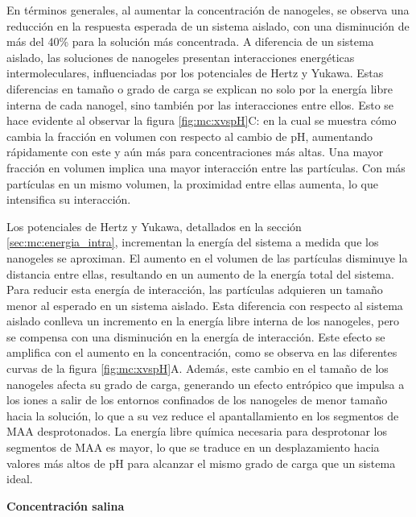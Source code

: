	En t\'erminos generales, al aumentar la concentraci\'on de nanogeles, se observa una reducci\'on en la respuesta esperada de un sistema aislado, con una disminuci\'on de m\'as del 40\% para la soluci\'on m\'as concentrada. A diferencia de un sistema aislado, las soluciones de nanogeles presentan interacciones energ\'eticas intermoleculares, influenciadas por los potenciales de Hertz y Yukawa. Estas diferencias en tama\~no o grado de carga se explican no solo por la energ\'ia libre interna de cada nanogel, sino tambi\'en por las interacciones entre ellos. Esto se hace evidente al observar la figura \ref{fig:mc:xvspH}C: en la cual se muestra c\'omo cambia la fracci\'on en volumen con respecto al cambio de pH, aumentando r\'apidamente con este y a\'un m\'as para concentraciones m\'as altas. Una mayor fracci\'on en volumen implica una mayor interacci\'on entre las part\'iculas. Con m\'as part\'iculas en un mismo volumen, la proximidad entre ellas aumenta, lo que intensifica su interacci\'on.
	
	Los potenciales de Hertz y Yukawa, detallados en la secci\'on \ref{sec:mc:energia_intra}, incrementan la energ\'ia del sistema a medida que los nanogeles se aproximan. El aumento en el volumen de las part\'iculas disminuye la distancia entre ellas, resultando en un aumento de la energ\'ia total del sistema. Para reducir esta energ\'ia de interacci\'on, las part\'iculas adquieren un tama\~no menor al esperado en un sistema aislado. Esta diferencia con respecto al sistema aislado conlleva un incremento en la energ\'ia libre interna de los nanogeles, pero se compensa con una disminuci\'on en la energ\'ia de interacci\'on. Este efecto se amplifica con el aumento en la concentraci\'on, como se observa en las diferentes curvas de la figura \ref{fig:mc:xvspH}A. Adem\'as, este cambio en el tama\~no de los nanogeles afecta su grado de carga, generando un efecto entr\'opico que impulsa a los iones a salir de los entornos confinados de los nanogeles de menor tama\~no hacia la soluci\'on, lo que a su vez reduce el apantallamiento en los segmentos de MAA desprotonados. La energ\'ia libre qu\'imica necesaria para desprotonar los segmentos de MAA es mayor, lo que se traduce en un desplazamiento hacia valores m\'as altos de pH para alcanzar el mismo grado de carga que un sistema ideal.
	
	\textbf{Concentraci\'on salina}
	
